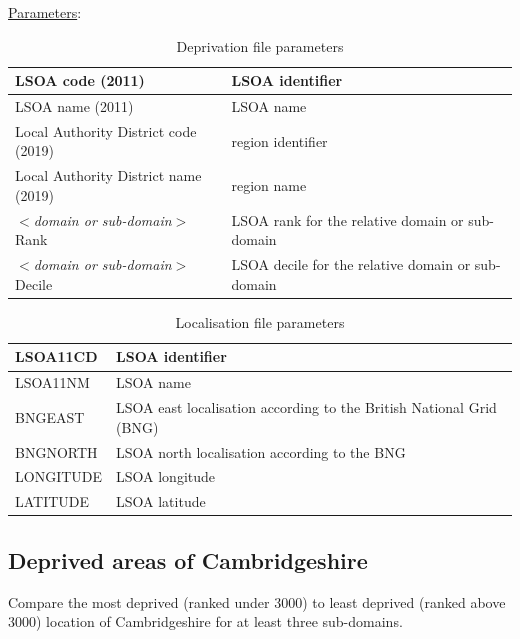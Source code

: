 \documentclass[11pt]{article}
\begin{document}
\underline{Parameters}:

\begin{table}[h!]
    \centering
    \begin{tabular}{|l|m{9cm}|}
        \hline
        LSOA code (2011) & LSOA identifier \\
        \hline
        LSOA name (2011) & LSOA name \\
        \hline
        Local Authority District code (2019) & region identifier \\
        \hline
        Local Authority District name (2019) & region name \\
        \hline
        $<$\textit{domain or sub-domain}$>$ Rank & LSOA rank for the relative domain or sub-domain \\
        \hline
        $<$\textit{domain or sub-domain}$>$ Decile &  LSOA decile for the relative domain or sub-domain \\
        \hline
    \end{tabular}
    \caption{Deprivation file parameters}
    \label{tab:Deprivation}
\end{table}

\begin{table}[h!]
    \centering
    \begin{tabular}{|l|m{13cm}|}
        \hline
        LSOA11CD & LSOA identifier \\
        \hline
        LSOA11NM & LSOA name \\
        \hline
        BNGEAST & LSOA east localisation according to the British National Grid (BNG) \\
        \hline
        BNGNORTH & LSOA north localisation according to the BNG \\
        \hline
        LONGITUDE & LSOA longitude \\
        \hline
        LATITUDE & LSOA latitude \\
        \hline
    \end{tabular}
    \caption{Localisation file parameters}
    \label{tab:Localisation}
\end{table}

\subsection{Deprived areas of Cambridgeshire}

Compare the most deprived (ranked under 3000) to least deprived (ranked above 3000) location of Cambridgeshire for at least three sub-domains.\\
\end{document}
